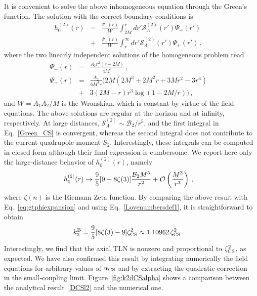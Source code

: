 \documentclass[aps,twocolumn,showpacs,preprintnumbers,nofootinbib,prd,superscriptaddress,groupedaddress,10pt]{revtex4-1}
\def\nn{\nonumber}
\begin{document}
It is convenient to solve the above inhomogeneous equation through the Green's function. The solution with the correct boundary conditions is
%
\begin{eqnarray}
 {h_0^{(2)}}(r) &=& \frac{\Psi_+(r)}{W}\int_{2M}^r dr' \mathcal{S}_A^{(2)}(r') \Psi_-(r')\nn\\
 &+&\frac{\Psi_-(r)}{W}\int_{r}^{\infty} dr' \mathcal{S}_A^{(2)}(r') \Psi_+(r') \,, \label{Green_CS}
\end{eqnarray}
%
where the two linearly independent solutions of the homogeneous problem read
\begin{eqnarray}
\Psi_-(r) &=& \frac{A_1 r^2 (r-2 M)}{4 M^3}\,,\\
%
\Psi_+(r) &=& \frac{A_2}{6 M^3 r} \biggl(2 M \left(2 M^3+2 M^2 r+3 M r^2-3 r^3\right) \nn\\
%
&+&3 (2 M-r) r^3 \log(1-2M/r)\biggr)\,,
\end{eqnarray}
%
and $W= A_1 A_2/M$ is the Wronskian, which is constant by virtue of the field equations. The above solutions are regular at the horizon and at infinity, respectively.
%
At large distances, $\mathcal{S}_A^{(2)}\sim \mathcal{B}_2/r^5$, and the first integral in Eq.~\eqref{Green_CS} is convergent, whereas the second integral does not contribute to the current quadrupole moment $S_2$. Interestingly, these integrals can be computed in closed form although their final expression is cumbersome. We report here only the large-distance behavior of ${h_0^{(2)}}(r)$, namely
%
\begin{equation}
 {h_0^{(2)}}(r) \to \frac{9}{5} [9-8 \zeta(3)]\frac{\mathcal{B}_2 M^5 }{r^2}+{\cal O}\left(\frac{M^3}{r^3}\right)\,,
\end{equation}
%
where $\zeta(n)$ is the Riemann Zeta function. By comparing the above result with Eq.~\eqref{eq:gtphiexpansion} and using Eq.~\eqref{Lovenumbersdef1}, it is straightforward to obtain
%
\begin{equation}
 k_2^{\rm B} = \frac{9}{5} [8 \zeta (3)-9]\zeta_{\rm CS}^2\approx 1.10962\,\zeta_{\rm CS}^2 \,. \label{DCSl2}
\end{equation}
%
Interestingly, we find that the axial TLN is nonzero and proportional to $\zeta_{\rm CS}^2$, as expected. We have also confirmed this result by integrating numerically the field equations for arbitrary values of $\alpha_{\rm CS}$ and by extracting the quadratic correction in the small-coupling limit.
Figure~\ref{fig:k2dCSalpha} shows a comparison between the analytical result~\eqref{DCSl2} and the numerical one. 
\end{document}
